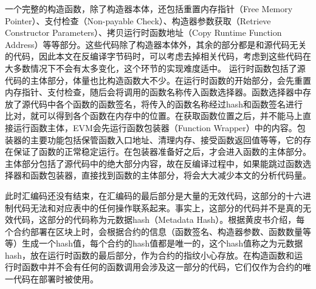 一个完整的构造函数，除了构造器本体，还包括重置内存指针（Free Memory Pointer）、支付检查（Non-payable Check）、构造器参数获取（Retrieve Constructor Parameters）、拷贝运行时函数地址（Copy Runtime Function Address）等等部分。这些代码除了构造器本体外，其余的部分都是和源代码无关的代码，因此本文在反编译字节码时，可以考虑去掉相关代码，考虑到这些代码在大多数情况下不会有太多变化，这个环节的实现难度适中。
运行时函数包括了源代码的主体部分，体量也比构造函数大不少。在运行时函数的开始部分，会先重置内存指针、支付检查，随后会将调用的函数名称传入函数选择器。函数选择器中存放了源代码中各个函数的函数签名，将传入的函数名称经过hash和函数签名进行比对，就可以得到各个函数在内存中的位置。在获取函数位置之后，并不能马上直接运行函数主体，EVM会先运行函数包装器（Function Wrapper）中的内容。包装器的主要功能包括保管函数入口地址、清理内存、接受函数返回值等等，它的存在保证了函数的正常稳定运行。在包装器准备好之后，才会进入函数的主体部分。主体部分包括了源代码中的绝大部分内容，故在反编译过程中，如果能跳过函数选择器和函数包装器，直接找到函数的主体部分，将会大大减少本文的分析代码量。

此时汇编码还没有结束，在汇编码的最后部分是大量的无效代码，这部分的十六进制代码无法和对应表中的任何操作联系起来。事实上，这部分的代码并不是真的无效代码，这部分的代码称为元数据hash（Metadata Hash）。根据黄皮书介绍，每个合约部署在区块上时，会根据合约的信息（函数签名、构造器参数、函数数量等等）生成一个hash值，每个合约的hash值都是唯一的，这个hash值称之为元数据hash，放在运行时函数的最后部分，作为合约的指纹小心存放。在构造函数和运行时函数中并不会有任何的函数调用会涉及这一部分的代码，它们仅作为合约的唯一代码在部署时被使用。
